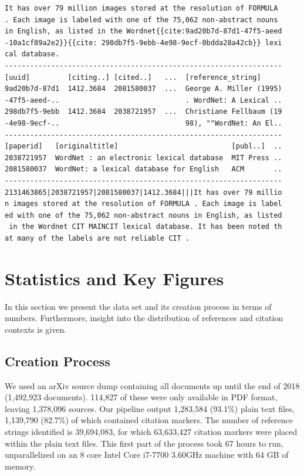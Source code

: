 \begin{lstlisting}[caption={Excerpts from (top to bottom) a paper's plain text, corresponding entries in the references database, entries in the MAG, and extracted citation context CSV},label={lst:formatall}]
It has over 79 million images stored at the resolution of FORMULA 
. Each image is labeled with one of the 75,062 non-abstract nouns 
in English, as listed in the Wordnet{{cite:9ad20b7d-87d1-47f5-aeed
-10a1cf89a2e2}}{{cite: 298db7f5-9ebb-4e98-9ecf-0bdda28a42cb}} lexi
cal database.
------------------------------------------------------------------
[uuid]         [citing..] [cited..]   ...  [reference_string]
9ad20b7d-87d1  1412.3684  2081580037  ...  George A. Miller (1995)
-47f5-aeed-..                              . WordNet: A Lexical ..
298db7f5-9ebb  1412.3684  2038721957  ...  Christiane Fellbaum (19
-4e98-9ecf-..                              98), ""WordNet: An El..
------------------------------------------------------------------
[paperid]   [originaltitle]                           [publ..]  ..
2038721957  WordNet : an electronic lexical database  MIT Press ..
2081580037  WordNet: a lexical database for English   ACM       ..
------------------------------------------------------------------
2131463865|2038721957|2081580037|1412.3684|||It has over 79 millio
n images stored at the resolution of FORMULA . Each image is label
ed with one of the 75,062 non-abstract nouns in English, as listed
 in the Wordnet CIT MAINCIT lexical database. It has been noted th
at many of the labels are not reliable CIT .
\end{lstlisting}

\section{Statistics and Key Figures}
\label{sec:statistics}

In this section we present the data set and its creation process in terms of numbers. Furthermore, insight into the distribution of references and citation contexts is given.

\subsection{Creation Process}
We used an arXiv source dump containing all documents up until the end of 2018 (1,492,923 documents). 114,827 of these were only available in PDF format, leaving 1,378,096 sources. Our pipeline output 1,283,584 (93.1\%) plain text files, 1,139,790 (82.7\%) of which contained citation markers. The number of reference strings identified is 39,694,083, for which 63,633,427 citation markers were placed within the plain text files. This first part of the process took 67 hours to run, unparallelized on an 8 core Intel Core i7-7700 3.60GHz machine with 64 GB of memory.

